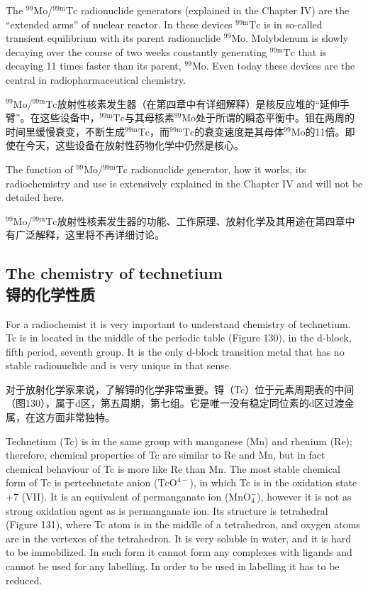 \documentclass[dvipsnames, svgnames,a4paper,11pt]{article}
\begin{document}
The ${}^\mathrm{99}\mathrm{Mo}$/${}^\mathrm{99m}\mathrm{Tc}$ radionuclide generators (explained in the Chapter IV) are the
“extended arms” of nuclear reactor. In these devices ${}^\mathrm{99m}\mathrm{Tc}$ is in so-called transient
equilibrium with its parent radionuclide ${}^\mathrm{99}\mathrm{Mo}$. Molybdenum is slowly decaying over
the course of two weeks constantly generating ${}^\mathrm{99m}\mathrm{Tc}$ that is decaying 11 times faster
than its parent, ${}^\mathrm{99}\mathrm{Mo}$. Even today these devices are the central in
radiopharmaceutical chemistry.

${}^\mathrm{99}\mathrm{Mo}$/${}^\mathrm{99m}\mathrm{Tc}$放射性核素发生器（在第四章中有详细解释）是核反应堆的“延伸手臂”。在这些设备中，${}^\mathrm{99m}\mathrm{Tc}$与其母核素${}^\mathrm{99}\mathrm{Mo}$处于所谓的瞬态平衡中。钼在两周的时间里缓慢衰变，不断生成${}^\mathrm{99m}\mathrm{Tc}$，而${}^\mathrm{99m}\mathrm{Tc}$的衰变速度是其母体${}^\mathrm{99}\mathrm{Mo}$的11倍。即使在今天，这些设备在放射性药物化学中仍然是核心。

The function of ${}^\mathrm{99}\mathrm{Mo}$/${}^\mathrm{99m}\mathrm{Tc}$ radionuclide generator, how it works, its radiochemistry
and use is extensively explained in the Chapter IV and will not be detailed here.

${}^\mathrm{99}\mathrm{Mo}$/${}^\mathrm{99m}\mathrm{Tc}$放射性核素发生器的功能、工作原理、放射化学及其用途在第四章中有广泛解释，这里将不再详细讨论。

\subsection{The chemistry of technetium \\锝的化学性质}

For a radiochemist it is very important to understand chemistry of technetium. Tc is
in located in the middle of the periodic table (Figure 130), in the d-block, fifth period,
seventh group. It is the only d-block transition metal that has no stable radionuclide
and is very unique in that sense.

对于放射化学家来说，了解锝的化学非常重要。锝（Tc）位于元素周期表的中间（图130），属于d区，第五周期，第七组。它是唯一没有稳定同位素的d区过渡金属，在这方面非常独特。

Technetium (Tc) is in the same group with manganese (Mn) and rhenium (Re);
therefore, chemical properties of Tc are similar to Re and Mn, but in fact chemical
behaviour of Tc is more like Re than Mn. The most stable chemical form of Tc is
pertechnetate anion ($\mathrm{TcO^{4-}}$), in which Tc is in the oxidation state +7 (VII). It is an
equivalent of permanganate ion ($\mathrm{MnO_4^-}$), however it is not as strong oxidation agent
as is permanganate ion. Its structure is tetrahedral (Figure 131), where Tc atom is in
the middle of a tetrahedron, and oxygen atoms are in the vertexes of the tetrahedron.
It is very soluble in water, and it is hard to be immobilized. In such form it cannot
form any complexes with ligands and cannot be used for any labelling. In order to be
used in labelling it has to be reduced.
\end{document}

